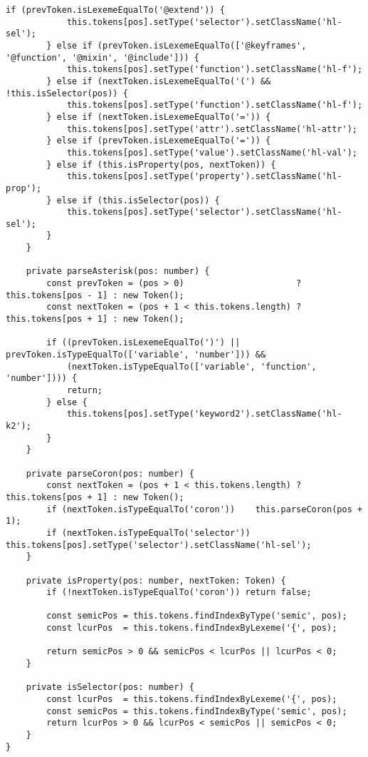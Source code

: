 \documentclass[autodetect-engine,dvi=dvipdfmx,ja=standard,
               a4j,11pt]{bxjsarticle}
\begin{document}
\begin{lstlisting}[caption={CSS/SCSSハイライタ({\tt scss.ts})(2)}, label={prog:scss2}]
        if (prevToken.isLexemeEqualTo('@extend')) {
            this.tokens[pos].setType('selector').setClassName('hl-sel');
        } else if (prevToken.isLexemeEqualTo(['@keyframes', '@function', '@mixin', '@include'])) {
            this.tokens[pos].setType('function').setClassName('hl-f');
        } else if (nextToken.isLexemeEqualTo('(') && !this.isSelector(pos)) {
            this.tokens[pos].setType('function').setClassName('hl-f');
        } else if (nextToken.isLexemeEqualTo('=')) {
            this.tokens[pos].setType('attr').setClassName('hl-attr');
        } else if (prevToken.isLexemeEqualTo('=')) {
            this.tokens[pos].setType('value').setClassName('hl-val');
        } else if (this.isProperty(pos, nextToken)) {
            this.tokens[pos].setType('property').setClassName('hl-prop');
        } else if (this.isSelector(pos)) {
            this.tokens[pos].setType('selector').setClassName('hl-sel');
        }
    }

    private parseAsterisk(pos: number) {
        const prevToken = (pos > 0)                      ? this.tokens[pos - 1] : new Token();
        const nextToken = (pos + 1 < this.tokens.length) ? this.tokens[pos + 1] : new Token();
    
        if ((prevToken.isLexemeEqualTo(')') || prevToken.isTypeEqualTo(['variable', 'number'])) &&
            (nextToken.isTypeEqualTo(['variable', 'function', 'number']))) {
            return;
        } else {
            this.tokens[pos].setType('keyword2').setClassName('hl-k2');
        }
    }

    private parseCoron(pos: number) {
        const nextToken = (pos + 1 < this.tokens.length) ? this.tokens[pos + 1] : new Token();
        if (nextToken.isTypeEqualTo('coron'))    this.parseCoron(pos + 1);
        if (nextToken.isTypeEqualTo('selector')) this.tokens[pos].setType('selector').setClassName('hl-sel');
    }

    private isProperty(pos: number, nextToken: Token) {
        if (!nextToken.isTypeEqualTo('coron')) return false;

        const semicPos = this.tokens.findIndexByType('semic', pos);
        const lcurPos  = this.tokens.findIndexByLexeme('{', pos);
        
        return semicPos > 0 && semicPos < lcurPos || lcurPos < 0;
    }

    private isSelector(pos: number) {
        const lcurPos  = this.tokens.findIndexByLexeme('{', pos);
        const semicPos = this.tokens.findIndexByType('semic', pos);
        return lcurPos > 0 && lcurPos < semicPos || semicPos < 0;
    }
}
\end{lstlisting}
\end{document}
